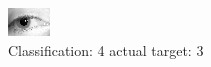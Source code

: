 \begin{figure}[h!]
\begin{center}
\includegraphics[width=0.60\columnwidth]{figures/ID1306_class_4_target_3.png}
\end{center}
\caption{ Classification: 4 actual target: 3}
\label{fig:ID1306_class_4_target_3}
\end{figure}
